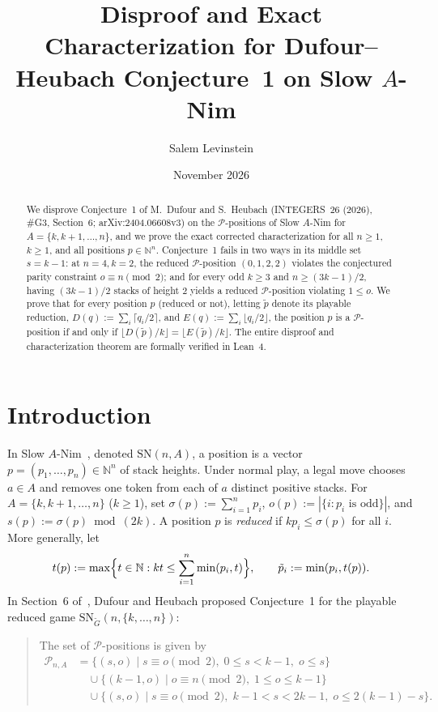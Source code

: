 \documentclass[11pt]{article}
\title{Disproof and Exact Characterization for Dufour--Heubach Conjecture~1 on Slow $A$-Nim}
\author{Salem Levinstein}
\date{November 2026}
\begin{document}
\maketitle

\begin{abstract}
We disprove Conjecture~1 of M.~Dufour and S.~Heubach (INTEGERS~26 (2026),
\#G3, Section~6; arXiv:2404.06608v3) on the $\mathcal{P}$-positions of Slow
$A$-Nim for $A = \{k, k+1, \dots, n\}$, and we prove the exact corrected
characterization for all $n \ge 1$, $k \ge 1$, and all positions
$p \in \mathbb{N}^n$. Conjecture~1 fails in two ways in its middle set
$s = k - 1$: at $n = 4, k = 2$, the reduced $\mathcal{P}$-position
$(0, 1, 2, 2)$ violates the conjectured parity constraint $o \equiv n \pmod 2$;
and for every odd $k \ge 3$ and $n \ge (3k - 1)/2$, having $(3k - 1)/2$ stacks
of height $2$ yields a reduced $\mathcal{P}$-position violating $1 \le o$. We
prove that for every position $p$ (reduced or not), letting $\tilde p$ denote
its playable reduction, $D(q) := \sum_i \lceil q_i / 2 \rceil$, and
$E(q) := \sum_i \lfloor q_i / 2 \rfloor$, the position $p$ is a
$\mathcal{P}$-position if and only if
$\lfloor D(\tilde p) / k \rfloor = \lfloor E(\tilde p) / k \rfloor$. The entire
disproof and characterization theorem are formally verified in Lean~4.
\end{abstract}

\section{Introduction}

In Slow $A$-Nim~\cite{DH2026}, denoted $\mathrm{SN}(n, A)$, a position is a
vector $p = (p_1, \dots, p_n) \in \mathbb{N}^n$ of stack heights. Under normal
play, a legal move chooses $a \in A$ and removes one token from each of $a$
distinct positive stacks. For $A = \{k, k+1, \dots, n\}$ ($k \ge 1$), set
$\sigma(p) := \sum_{i=1}^n p_i$, $o(p) := |\{i : p_i \text{ is odd}\}|$, and
$s(p) := \sigma(p) \bmod (2k)$. A position $p$ is \emph{reduced} if
$k p_i \le \sigma(p)$ for all $i$. More generally, let
\[
t(p) := \max \Bigl\{ t \in \mathbb{N} : k t \le \sum_{i=1}^n \min(p_i, t) \Bigr\},
\qquad
\tilde p_i := \min(p_i, t(p)).
\]
In Section~6 of~\cite{DH2026}, Dufour and Heubach proposed Conjecture~1 for the
playable reduced game $\mathrm{SN}_{\tilde G}(n, \{k, \dots, n\})$:
\begin{quote}
The set of $\mathcal{P}$-positions is given by
\begin{align*}
\mathcal{P}_{n,A} &= \{(s, o) \mid s \equiv o \pmod 2,\; 0 \le s < k - 1,\; o \le s\} \\
&\quad \cup \{(k - 1, o) \mid o \equiv n \pmod 2,\; 1 \le o \le k - 1\} \\
&\quad \cup \{(s, o) \mid s \equiv o \pmod 2,\; k - 1 < s < 2k - 1,\; o \le 2(k - 1) - s\}.
\end{align*}
\end{quote}
\end{document}
